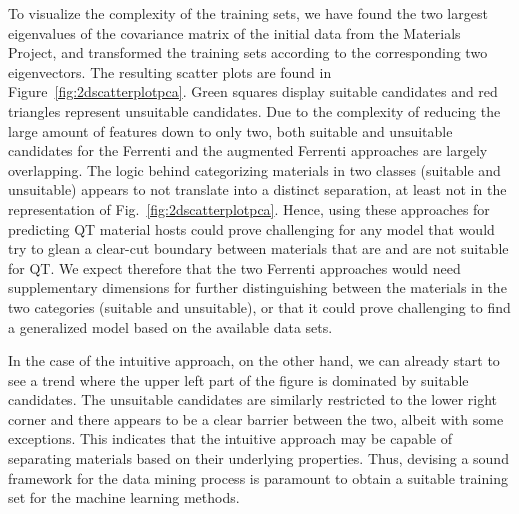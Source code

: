 \documentclass[superscriptaddress,unsortedaddress,
 amsmath,amssymb,
 aps,
]{revtex4-2}
\begin{document}
To visualize the complexity of the training sets, we have found the two largest eigenvalues of the covariance matrix \cite{Hastie2009} of the initial data from the Materials Project, and transformed the training sets according to the corresponding two eigenvectors. The resulting scatter plots are found in Figure~\ref{fig:2dscatterplotpca}. 
Green squares display suitable candidates and red triangles represent unsuitable candidates. 
Due to the complexity of reducing the large amount of features down to only two, both suitable and unsuitable candidates for the Ferrenti and the augmented Ferrenti approaches are largely overlapping. 
The logic behind categorizing materials in  two classes (suitable and unsuitable) appears to not translate into a distinct separation, at least not in the representation of Fig.~\ref{fig:2dscatterplotpca}. 
Hence, using these approaches for predicting QT material hosts could prove challenging for any model that would try to glean a clear-cut boundary between materials that are and are not suitable for QT. 
We expect therefore that the two Ferrenti approaches would need supplementary dimensions for further distinguishing between the materials in the two categories (suitable and unsuitable), or that it could prove challenging to find a generalized model based on the available data sets.  

In the case of the intuitive approach, on the other hand, we can already start to see a trend where the upper left part of the figure is dominated by suitable candidates. The unsuitable candidates are similarly restricted to the lower right corner and there appears to be a clear barrier between the two, albeit with some exceptions. This indicates that the intuitive approach may be capable of separating materials based on their underlying properties.  
Thus, devising a sound framework for the data mining process is paramount to obtain a suitable training set for the machine learning methods. 
\end{document}
